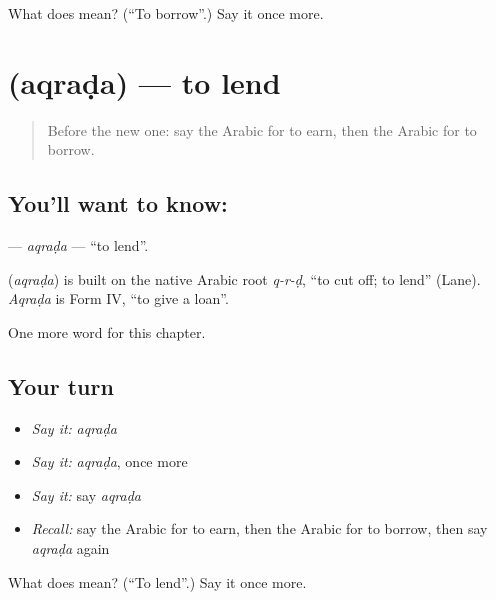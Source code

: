 \begin{tcolorbox}[breakable,colback=teal!4,colframe=teal!35!black,title={Before you move on}]
What does  mean? (\textquotedblleft{}To borrow\textquotedblright{}.) Say it once more.
\end{tcolorbox}
\section[\texorpdfstring{\ar{أقرض} (aqraḍa)}{أقرض (aqraḍa)}]{ (aqraḍa) — to lend}

\label{lesson:AR-C224-aqrada}



\begin{quote}
Before the new one: say the Arabic for to earn, then the Arabic for to borrow.
\end{quote}

\subsection*{You'll want to know: }
\textbf{} — \emph{aqraḍa} — \textquotedblleft{}to lend\textquotedblright{}.

\begin{cousinweb}
\textbf{} (\emph{aqraḍa}) is built on the native Arabic root \emph{q-r-ḍ}, \textquotedblleft{}to cut off; to lend\textquotedblright{} (Lane). \emph{Aqraḍa} is Form IV, \textquotedblleft{}to give a loan\textquotedblright{}.
\end{cousinweb}

\begin{grammarlens}[title={What you've built}]
One more word for this chapter.
\end{grammarlens}

\subsection*{Your turn}
\begin{itemize}
\raggedright
  \item \emph{Say it:} \emph{aqraḍa}
  \item \emph{Say it:} \emph{aqraḍa}, once more
  \item \emph{Say it:} say \emph{aqraḍa}
  \item \emph{Recall:} say the Arabic for to earn, then the Arabic for to borrow, then say \emph{aqraḍa} again
\end{itemize}

\begin{tcolorbox}[breakable,colback=teal!4,colframe=teal!35!black,title={Before you move on}]
What does  mean? (\textquotedblleft{}To lend\textquotedblright{}.) Say it once more.
\end{tcolorbox}
